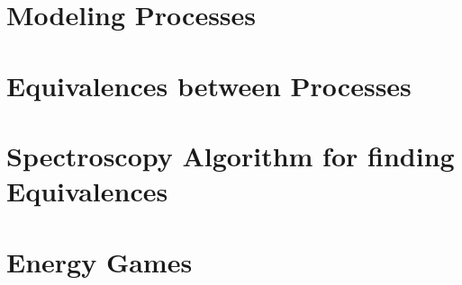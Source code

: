 \section{Modeling Processes}

\section{Equivalences between Processes}

\section{Spectroscopy Algorithm for finding Equivalences}

\section{Energy Games}
